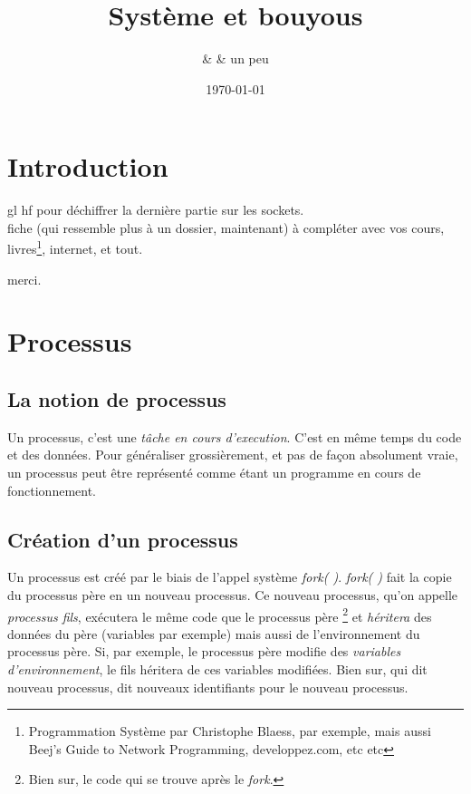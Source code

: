 \documentclass{report}
\title{Système et bouyous}
\author{\bsc{Borey UK} \& \bsc{Steeve VINCENT} \& un peu \bsc{Elias MIA}}
\date{\today}
\begin{document}
\maketitle{}

\chapter*{Introduction}
gl hf pour déchiffrer la dernière partie sur les sockets.\\
fiche (qui ressemble plus à un dossier, maintenant) à compléter avec vos cours, livres\footnote{Programmation Système par Christophe Blaess, par exemple, mais aussi Beej's Guide to Network Programming, developpez.com, etc etc}, internet, et tout.\\
\begin{center}
\end{center}
\begin{center}
merci.
\end{center}


\chapter{Processus}
\section{La notion de processus}
Un processus, c'est une \emph{tâche en cours d'execution}. C'est en même temps du code et des données. Pour généraliser grossièrement, et pas de façon absolument vraie, un processus peut être représenté comme étant un programme en cours de fonctionnement.

\section{Création d'un processus}
Un processus est créé par le biais de l'appel système \emph{fork( )}. \emph{fork( )} fait la copie du processus père en un nouveau processus. Ce nouveau processus, qu'on appelle \emph{processus fils}, exécutera le même code que le processus père \footnote{Bien sur, le code qui se trouve après le \emph{fork}.} et \emph{héritera} des données du père (variables par exemple) mais aussi de l'environnement du processus père. Si, par exemple, le processus père modifie des \emph{variables d'environnement}, le fils héritera de ces variables modifiées.
Bien sur, qui dit nouveau processus, dit nouveaux identifiants pour le nouveau processus.
\end{document}

